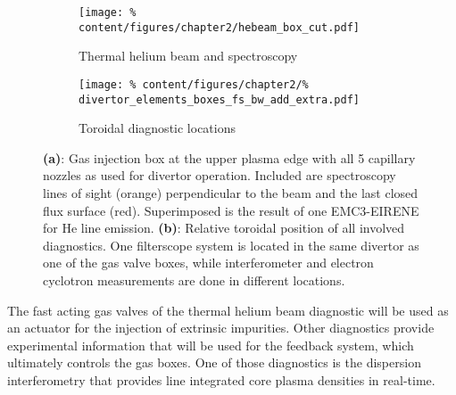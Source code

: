         \begin{figure}[t]%
            \centering%
            \begin{subfigure}{0.42\textwidth}%
                \texttt{[image: \%
                    content/figures/chapter2/hebeam\_box\_cut.pdf]}%
                \caption{Thermal helium beam and spectroscopy%
                }\label{fig:hebeam}%
            \end{subfigure}%
            \hfill%
            \begin{subfigure}{0.55\textwidth}%
                \texttt{[image: \%
                    content/figures/chapter2/\%
                    divertor\_elements\_boxes\_fs\_bw\_add\_extra.pdf]}%
                \caption{Toroidal diagnostic locations}\label{fig:positions}%
            \end{subfigure}%
            \caption{\textbf{(a)}: Gas injection box at the upper plasma edge with all 5 capillary nozzles as used for divertor operation. Included are spectroscopy lines of sight (orange) perpendicular to the beam and the last closed flux surface (red). Superimposed is the result of one EMC3-EIRENE for He line emission\cite{Barbui2016}. \textbf{(b)}: Relative toroidal position of all involved diagnostics. One filterscope system is located in the same divertor as one of the gas valve boxes, while interferometer and electron cyclotron measurements are done in different locations.}\label{fig:hebeam_pos}%
        \end{figure}%
%
        \newline%
        The fast acting gas valves of the thermal helium beam diagnostic will be used as an actuator for the injection of extrinsic impurities. Other diagnostics provide experimental information that will be used for the feedback system, which ultimately controls the gas boxes. One of those diagnostics is the dispersion interferometry that provides line integrated core plasma densities in real-time.
%
